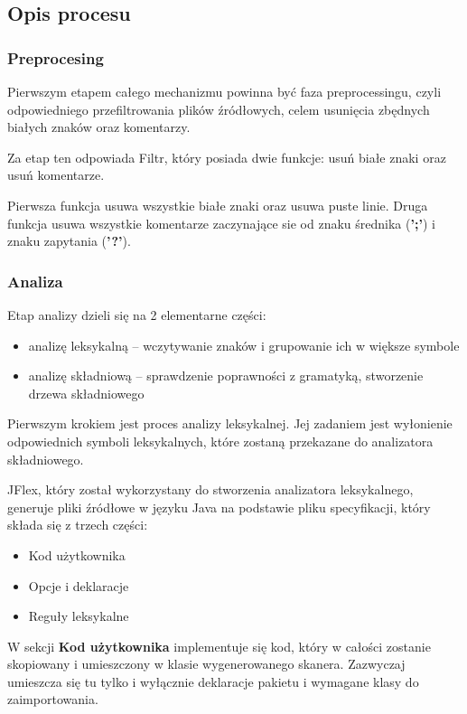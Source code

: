 \documentclass[a4paper,12pt]{article}
\begin{document}
\newpage

\subsection{Opis procesu}

\subsubsection{Preprocesing}

Pierwszym etapem całego mechanizmu powinna być faza preprocessingu, czyli odpowiedniego przefiltrowania plików źródłowych, celem usunięcia zbędnych białych znaków oraz komentarzy.

Za etap ten odpowiada Filtr, który posiada dwie funkcje: usuń białe znaki oraz usuń komentarze.

Pierwsza funkcja usuwa wszystkie białe znaki oraz usuwa puste linie. Druga funkcja usuwa wszystkie komentarze zaczynające sie od znaku średnika (\textbf{';'}) i znaku zapytania (\textbf{'?'}).

\subsubsection{Analiza}

Etap analizy dzieli się na 2 elementarne części:
\begin{itemize}
\item analizę leksykalną – wczytywanie znaków i grupowanie ich w większe symbole
\item analizę składniową – sprawdzenie poprawności z gramatyką, stworzenie drzewa składniowego 
\end{itemize}

Pierwszym krokiem jest proces analizy leksykalnej. Jej zadaniem jest wyłonienie odpowiednich symboli leksykalnych, które zostaną przekazane do analizatora składniowego.

JFlex\cite{jflex}, który został wykorzystany do stworzenia analizatora leksykalnego, generuje pliki źródłowe w języku Java na podstawie pliku specyfikacji, który składa się z trzech części:
\begin{itemize}
\item Kod użytkownika
\item Opcje i deklaracje
\item Reguły leksykalne
\end{itemize}

\pagebreak

W sekcji \textbf{Kod użytkownika} implementuje się kod, który w całości zostanie skopiowany i umieszczony w klasie wygenerowanego skanera. Zazwyczaj umieszcza się tu tylko i wyłącznie deklaracje pakietu i wymagane klasy do zaimportowania.
\\
\end{document}
